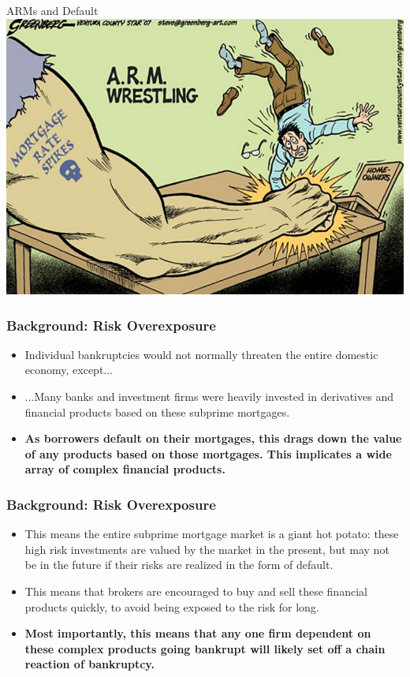 \documentclass{beamer}
\begin{document}
\begin{frame}{\LARGE ARMs and Default}
	\centering
	\includegraphics[width=\textwidth,height=.8\textheight,keepaspectratio]{Picture2.jpg}
\end{frame}

\begin{frame} 
	\frametitle{\LARGE{Background: Risk Overexposure}}
	\begin{itemize}
		\item Individual bankruptcies would not normally threaten the entire domestic economy, except...	
		\item ...Many banks and investment firms were heavily invested in derivatives and financial products based on these subprime mortgages. \pause
		\item \textbf{As borrowers default on their mortgages, this drags down the value of any products based on those mortgages. This implicates a wide array of complex financial products.} 
		
	\end{itemize}
\end{frame}

\begin{frame} 
	\frametitle{\LARGE{Background: Risk Overexposure}}
	\begin{itemize}
		\item This means the entire subprime mortgage market is a giant hot potato: these high risk investments are valued by the market in the present, but may not be in the future if their risks are realized in the form of default. \pause
		\item This means that brokers are encouraged to buy and sell these financial products quickly, to avoid being exposed to the risk for long. \pause
		\item \textbf{Most importantly, this means that any one firm dependent on these complex products going bankrupt will likely set off a chain reaction of bankruptcy.}
	\end{itemize}
\end{frame}
\end{document}
